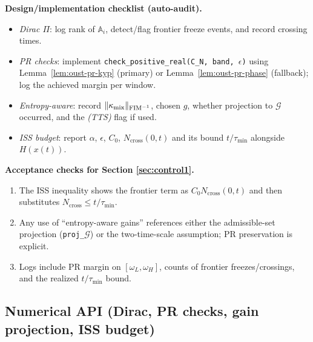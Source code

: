 \begin{mdframed}
\textbf{Design/implementation checklist (auto-audit).}
\begin{itemize}[leftmargin=*]
\item \emph{Dirac $\Pi$}: log rank of $\mathbb A_i$, detect/flag frontier freeze events, and record crossing times.
\item \emph{PR checks}: implement \texttt{check\_positive\_real(C\_N, band, $\epsilon$)} using Lemma~\ref{lem:oust-pr-kyp} (primary) or Lemma~\ref{lem:oust-pr-phase} (fallback); log the achieved margin per window.
\item \emph{Entropy-aware}: record $\|\kappa_{\mathrm{mix}}\|_{\mathrm{FIM}^{-1}}$, chosen $g$, whether projection to $\mathcal G$ occurred, and the \emph{(TTS)} flag if used.
\item \emph{ISS budget}: report $\alpha$, $\epsilon$, $C_0$, $N_{\mathrm{cross}}(0,t)$ and its bound $t/\tau_{\min}$ alongside $H(x(t))$.
\end{itemize}
\end{mdframed}

\begin{mdframed}
\textbf{Acceptance checks for Section \ref{sec:control1}.}
\begin{enumerate}[leftmargin=*]
\item The ISS inequality shows the frontier term as $C_0 N_{\mathrm{cross}}(0,t)$ and then substitutes $N_{\mathrm{cross}}\le t/\tau_{\min}$.
\item Any use of ``entropy-aware gains'' references either the admissible-set projection (\texttt{proj\_}\(\mathcal G\)) or the two-time-scale assumption; PR preservation is explicit.
\item Logs include PR margin on $[\omega_L,\omega_H]$, counts of frontier freezes/crossings, and the realized $t/\tau_{\min}$ bound.
\end{enumerate}
\end{mdframed}

\subsection*{Numerical API (Dirac, PR checks, gain projection, ISS budget)}

